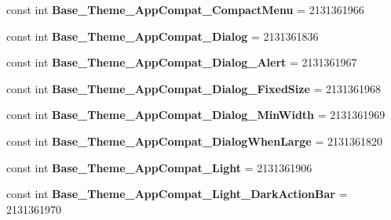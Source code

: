 \begin{DoxyCompactItemize}
const int {\bfseries Base\+\_\+\+Theme\+\_\+\+App\+Compat\+\_\+\+Compact\+Menu} = 2131361966
\item 
\mbox{\label{class_pinned_app_1_1_droid_1_1_resource_1_1_style_a65b1e71380f1c5fe0a192620a138e635}} 
const int {\bfseries Base\+\_\+\+Theme\+\_\+\+App\+Compat\+\_\+\+Dialog} = 2131361836
\item 
\mbox{\label{class_pinned_app_1_1_droid_1_1_resource_1_1_style_a6a48faf03aafc5bacb56daf5b84ea9ce}} 
const int {\bfseries Base\+\_\+\+Theme\+\_\+\+App\+Compat\+\_\+\+Dialog\+\_\+\+Alert} = 2131361967
\item 
\mbox{\label{class_pinned_app_1_1_droid_1_1_resource_1_1_style_a5f793546213eae983c600bbb2739a371}} 
const int {\bfseries Base\+\_\+\+Theme\+\_\+\+App\+Compat\+\_\+\+Dialog\+\_\+\+Fixed\+Size} = 2131361968
\item 
\mbox{\label{class_pinned_app_1_1_droid_1_1_resource_1_1_style_a108fb4bf7c54bc1ce3ebe3b6747bb522}} 
const int {\bfseries Base\+\_\+\+Theme\+\_\+\+App\+Compat\+\_\+\+Dialog\+\_\+\+Min\+Width} = 2131361969
\item 
\mbox{\label{class_pinned_app_1_1_droid_1_1_resource_1_1_style_a1aed5bd5f47d73712ba7e6a031621114}} 
const int {\bfseries Base\+\_\+\+Theme\+\_\+\+App\+Compat\+\_\+\+Dialog\+When\+Large} = 2131361820
\item 
\mbox{\label{class_pinned_app_1_1_droid_1_1_resource_1_1_style_ae2bcf509365c8c717bbe908b8551b9bd}} 
const int {\bfseries Base\+\_\+\+Theme\+\_\+\+App\+Compat\+\_\+\+Light} = 2131361906
\item 
\mbox{\label{class_pinned_app_1_1_droid_1_1_resource_1_1_style_a8a74e65d4325b1311c5b4b89f9c36656}} 
const int {\bfseries Base\+\_\+\+Theme\+\_\+\+App\+Compat\+\_\+\+Light\+\_\+\+Dark\+Action\+Bar} = 2131361970
\item 
\mbox{\label{class_pinned_app_1_1_droid_1_1_resource_1_1_style_a3e1f3c70a0f0d962083b7a43105e229e}} 

\end{DoxyCompactItemize}
